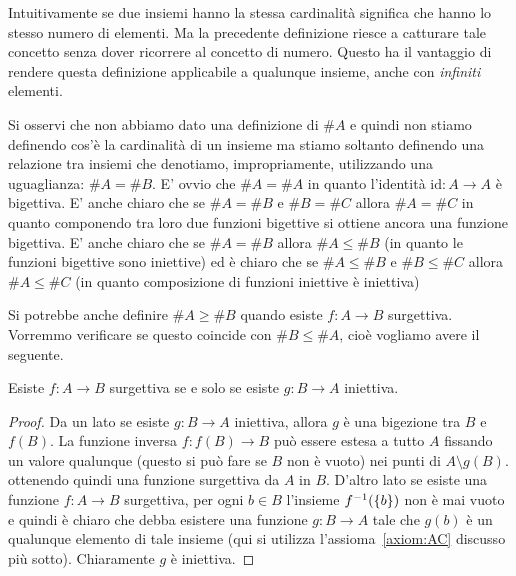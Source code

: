 Intuitivamente se due insiemi hanno la stessa cardinalità 
significa che hanno lo stesso numero di elementi.
Ma la precedente definizione riesce a catturare tale concetto senza dover 
ricorrere al concetto di numero. 
Questo ha il vantaggio di rendere questa definizione applicabile 
a qualunque insieme, anche con \emph{infiniti} elementi.

Si osservi che non abbiamo dato una definizione di $\#A$ e quindi non stiamo 
definendo cos'è la cardinalità di un insieme ma stiamo soltanto definendo 
una relazione tra insiemi che 
denotiamo, impropriamente, utilizzando una uguaglianza: $\#A = \#B$.
E' ovvio che $\#A = \#A$ in quanto l'identità $\mathrm{id}\colon A\to A$ è bigettiva.
E' anche chiaro che se $\#A = \#B$ e $\#B = \#C$ allora $\#A = \#C$ in quanto 
componendo tra loro due funzioni bigettive si ottiene ancora una funzione 
bigettiva. 
E' anche chiaro che se $\#A = \#B$ allora $\#A \le \#B$ (in quanto le funzioni bigettive 
sono iniettive) ed è chiaro che se $\#A \le \#B$ e $\#B \le \#C$ allora 
$\#A\le \#C$ (in quanto composizione di funzioni iniettive è iniettiva)

Si potrebbe anche definire $\#A \ge \#B$ quando esiste $f\colon A \to B$
surgettiva. Vorremmo verificare se questo coincide con $\#B \le \#A$, 
cioè vogliamo avere il seguente.
%
\begin{theorem}\label{th:95444}
  Esiste $f\colon A\to B$ surgettiva 
  se e solo se esiste $g\colon B\to A$ iniettiva.
\end{theorem}
% 
\begin{proof}
Da un lato se esiste $g\colon B\to A$ iniettiva, allora $g$ è una bigezione 
tra $B$ e $f(B)$. La funzione inversa $f\colon f(B) \to B$ 
può essere estesa a tutto $A$ fissando un valore qualunque 
(questo si può fare se $B$ non è vuoto) nei punti di $A\setminus g(B)$.
ottenendo quindi una funzione surgettiva da $A$ in $B$.
D'altro lato se esiste una funzione $f\colon A\to B$ surgettiva,
per ogni $b\in B$ l'insieme $f^{-1}({\left\{ b \right\}})$ non è mai 
vuoto e quindi è chiaro che debba esistere 
una funzione $g\colon B\to A$ tale che $g(b)$ è un qualunque elemento 
di tale insieme
(qui si utilizza l'assioma~\ref{axiom:AC} discusso più sotto). 
Chiaramente $g$ è iniettiva.
\end{proof}


